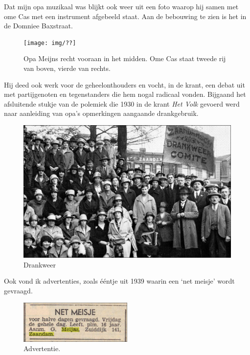 \documentclass[12pt,twoside]{memoir}
\begin{document}
Dat mijn opa muzikaal was blijkt ook weer uit een foto waarop hij samen met ome Cas met een instrument afgebeeld staat. Aan de bebouwing te zien is het in de Domniee Baxstraat.

\begin{figure}
\texttt{[image: img/??]}
\caption*{\footnotesize Opa Meijns recht vooraan in het midden. Ome Cas staat tweede rij van boven, vierde van rechts.}
\end{figure}

Hij deed ook werk voor de geheelonthouders en vocht, in de krant, een debat uit met partijgenoten en tegenstanders die hem nogal radicaal vonden. Bijgaand het afsluitende stukje van de polemiek die 1930 in de krant \emph{Het Volk} gevoerd werd naar aanleiding van opa’s opmerkingen aangaande drankgebruik.

\begin{figure}
\includegraphics[width=\textwidth]{img/ch2/ch2-afb06}
\caption*{\footnotesize Drankweer}
\end{figure}

Ook vond ik advertenties, zoals ééntje uit 1939 waarin een `net meisje' wordt gevraagd.

\begin{figure}[h!]
\includegraphics[width=0.5\textwidth]{img/ch2/ch2-afb07}
\caption*{\footnotesize Advertentie.}
\end{figure}
\end{document}
